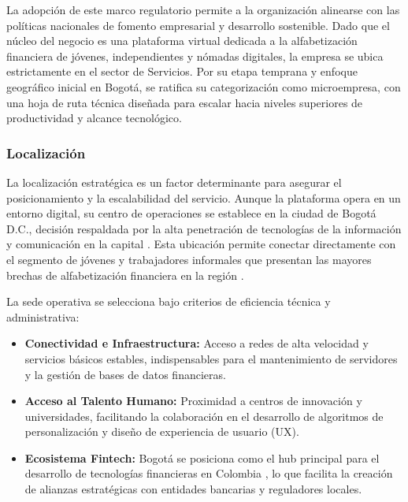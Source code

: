 La adopción de este marco regulatorio permite a la organización alinearse con las políticas nacionales de fomento empresarial y desarrollo sostenible. Dado que el núcleo del negocio es una plataforma virtual dedicada a la alfabetización financiera de jóvenes, independientes y nómadas digitales, la empresa se ubica estrictamente en el sector de Servicios. Por su etapa temprana y enfoque geográfico inicial en Bogotá, se ratifica su categorización como microempresa, con una hoja de ruta técnica diseñada para escalar hacia niveles superiores de productividad y alcance tecnológico.

\subsubsection*{Localización}

La localización estratégica es un factor determinante para asegurar el posicionamiento y la escalabilidad del servicio. Aunque la plataforma opera en un entorno digital, su centro de operaciones se establece en la ciudad de Bogotá D.C., decisión respaldada por la alta penetración de tecnologías de la información y comunicación en la capital \parencite{DANE_Internet2023}. Esta ubicación permite conectar directamente con el segmento de jóvenes y trabajadores informales que presentan las mayores brechas de alfabetización financiera en la región \parencite{DANE_Juventud2025}.

La sede operativa se selecciona bajo criterios de eficiencia técnica y administrativa:

\begin{itemize}
	\item \textbf{Conectividad e Infraestructura:} Acceso a redes de alta velocidad y servicios básicos estables, indispensables para el mantenimiento de servidores y la gestión de bases de datos financieras.
	
	\item \textbf{Acceso al Talento Humano:} Proximidad a centros de innovación y universidades, facilitando la colaboración en el desarrollo de algoritmos de personalización y diseño de experiencia de usuario (UX).
	
	\item \textbf{Ecosistema Fintech:} Bogotá se posiciona como el hub principal para el desarrollo de tecnologías financieras en Colombia \parencite{Finnovista2024}, lo que facilita la creación de alianzas estratégicas con entidades bancarias y reguladores locales.
\end{itemize}

